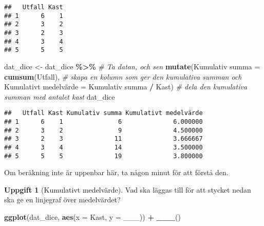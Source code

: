 \documentclass[
]{book}
\newenvironment{Shaded}{\begin{snugshade}}{\end{snugshade}}
\newcommand{\AttributeTok}[1]{\textcolor[rgb]{0.13,0.29,0.53}{#1}}
\newcommand{\CommentTok}[1]{\textcolor[rgb]{0.56,0.35,0.01}{\textit{#1}}}
\newcommand{\FunctionTok}[1]{\textcolor[rgb]{0.13,0.29,0.53}{\textbf{#1}}}
\newcommand{\NormalTok}[1]{#1}
\newcommand{\OtherTok}[1]{\textcolor[rgb]{0.56,0.35,0.01}{#1}}
\newcommand{\SpecialCharTok}[1]{\textcolor[rgb]{0.81,0.36,0.00}{\textbf{#1}}}
\newcommand{\StringTok}[1]{\textcolor[rgb]{0.31,0.60,0.02}{#1}}
\theoremstyle{definition}
\theoremstyle{definition}
\theoremstyle{definition}
\newtheorem{exercise}{Uppgift}[chapter]
\theoremstyle{definition}
\theoremstyle{remark}
\begin{document}
\begin{verbatim}
##   Utfall Kast
## 1      6    1
## 2      3    2
## 3      2    3
## 4      3    4
## 5      5    5
\end{verbatim}

\begin{Shaded}
\begin{Highlighting}[]
\NormalTok{dat\_dice }\OtherTok{\textless{}{-}}\NormalTok{ dat\_dice }\SpecialCharTok{\%\textgreater{}\%}                                        \CommentTok{\# Ta datan, och sen}
  \FunctionTok{mutate}\NormalTok{(}\StringTok{\textasciigrave{}}\AttributeTok{Kumulativ summa}\StringTok{\textasciigrave{}} \OtherTok{=} \FunctionTok{cumsum}\NormalTok{(Utfall),                    }\CommentTok{\# skapa en kolumn som ger den kumulativa summan och}
         \StringTok{\textasciigrave{}}\AttributeTok{Kumulativt medelvärde}\StringTok{\textasciigrave{}} \OtherTok{=} \StringTok{\textasciigrave{}}\AttributeTok{Kumulativ summa}\StringTok{\textasciigrave{}} \SpecialCharTok{/}\NormalTok{ Kast)    }\CommentTok{\# dela den kumulativa summan med antalet kast}
\NormalTok{dat\_dice}
\end{Highlighting}
\end{Shaded}

\begin{verbatim}
##   Utfall Kast Kumulativ summa Kumulativt medelvärde
## 1      6    1               6              6.000000
## 2      3    2               9              4.500000
## 3      2    3              11              3.666667
## 4      3    4              14              3.500000
## 5      5    5              19              3.800000
\end{verbatim}

Om beräkning inte är uppenbar här, ta någon minut för att förstå den.

\begin{exercise}[Kumulativt medelvärde]

Vad ska läggas till för att stycket nedan ska ge en linjegraf över medelvärdet?

\begin{Shaded}
\begin{Highlighting}[]
\FunctionTok{ggplot}\NormalTok{(dat\_dice, }\FunctionTok{aes}\NormalTok{(}\AttributeTok{x =}\NormalTok{ Kast, }\AttributeTok{y =}\NormalTok{ \_\_\_)) }\SpecialCharTok{+}
  \FunctionTok{\_\_\_}\NormalTok{()}
\end{Highlighting}
\end{Shaded}

\end{exercise}
\end{document}
